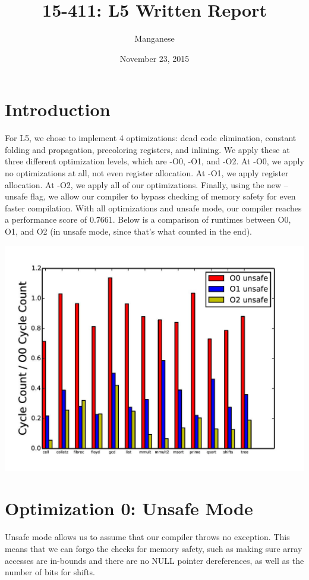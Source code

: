 \documentclass{article}
\title{15-411: L5 Written Report}
\author{Manganese}
\date{November 23, 2015}
\begin{document}
\maketitle

\section{Introduction}

For L5, we chose to implement 4 optimizations: dead code elimination, constant folding and propagation, precoloring registers, and inlining. We apply these at three different optimization levels, which are -O0, -O1, and -O2. At -O0, we apply no optimizations at all, not even register allocation. At -O1, we apply register allocation. At -O2, we apply all of our optimizations. Finally, using the new --unsafe flag, we allow our compiler to bypass checking of memory safety for even faster compilation. With all optimizations and unsafe mode, our compiler reaches a performance score of 0.7661. Below is a comparison of runtimes between O0, O1, and O2 (in unsafe mode, since that's what counted in the end).

\includegraphics[scale=0.5]{O0-O1-O2_unsafe-page-001}

\section{Optimization 0: Unsafe Mode}

Unsafe mode allows us to assume that our compiler throws no exception. This means that we can forgo the checks for memory safety, such as making sure array accesses are in-bounds and there are no NULL pointer dereferences, as well as the number of bits for shifts. 
\end{document}
